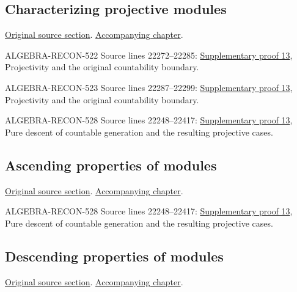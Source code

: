 \subsection{Characterizing projective modules}
\hypertarget{algebra-source-section-characterize-projective}{}
\noindent\href{https://github.com/stacks/stacks-project/blob/a04446e57ec1fbc252a871afcec7752fb2807b14/algebra.tex\#L22184}{Original source section}. \href{algebra.pdf\#nameddest=section-characterize-projective}{Accompanying chapter}.

\begin{AlgebraSourceRoutes}
\item[ALGEBRA-RECON-522] Source lines 22272--22285: \hyperlink{algebra_ml_coherent_notes_20260927}{Supplementary proof 13}, Projectivity and the original countability boundary.
\item[ALGEBRA-RECON-523] Source lines 22287--22299: \hyperlink{algebra_ml_coherent_notes_20260927}{Supplementary proof 13}, Projectivity and the original countability boundary.
\item[ALGEBRA-RECON-528] Source lines 22248--22417: \hyperlink{algebra_ml_coherent_notes_20260927}{Supplementary proof 13}, Pure descent of countable generation and the resulting projective cases.
\end{AlgebraSourceRoutes}

\subsection{Ascending properties of modules}
\hypertarget{algebra-source-section-ascent}{}
\noindent\href{https://github.com/stacks/stacks-project/blob/a04446e57ec1fbc252a871afcec7752fb2807b14/algebra.tex\#L22303}{Original source section}. \href{algebra.pdf\#nameddest=section-ascent}{Accompanying chapter}.

\begin{AlgebraSourceRoutes}
\item[ALGEBRA-RECON-528] Source lines 22248--22417: \hyperlink{algebra_ml_coherent_notes_20260927}{Supplementary proof 13}, Pure descent of countable generation and the resulting projective cases.
\end{AlgebraSourceRoutes}

\subsection{Descending properties of modules}
\hypertarget{algebra-source-section-descent}{}
\noindent\href{https://github.com/stacks/stacks-project/blob/a04446e57ec1fbc252a871afcec7752fb2807b14/algebra.tex\#L22332}{Original source section}. \href{algebra.pdf\#nameddest=section-descent}{Accompanying chapter}.

